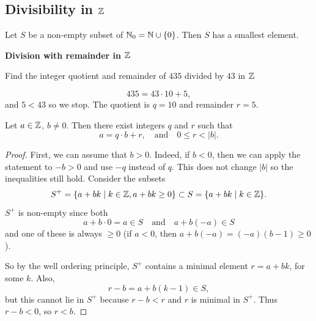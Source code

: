 \documentclass[10pt, a4paper]{article}
\begin{document}
\subsection{Divisibility in \texorpdfstring{$\mathbb{Z}$}{}}

\begin{lemma}
    Let $S$ be a non-empty subset of $\mathbb{N}_0 = \mathbb{N} \cup \{0\}$.
    Then $S$ has a smallest element.
\end{lemma}

\textbf{Division with remainder in $\mathbb{Z}$}

\begin{example}
    Find the integer quotient and remainder of $435$ divided by $43$ in $\mathbb{Z}$

    \begin{solution}
        \[
        435 = 43 \cdot 10 + 5,
        \]
        and $5 < 43$ so we stop.
        The quotient is $q = 10$ and remainder $r = 5$.
    \end{solution}
\end{example}

\begin{proposition}
    Let $a \in \mathbb{Z}$,
    $b \neq 0$.
    Then there exist integers $q$ and $r$ such that
    \[
    a = q \cdot b + r,\quad\text{and}\quad 0 \leq r < |b|.
    \]

    \begin{proof}
        First,
        we can assume that $b > 0$.
        Indeed,
        if $b < 0$,
        then we can apply the statement to $-b > 0$ and use $-q$ instead of $q$.
        This does not change $|b|$ so the inequalities still hold.
        Consider the subsets
        \[
        S ^ {+} = \{a + bk\mid k \in \mathbb{Z}, a + bk \geq 0\} \subset S = \{a + bk \mid k \in \mathbb{Z}\}.
        \]
        $S ^ {+}$ is non-empty since both
        \[
        a + b \cdot 0 = a \in S\quad\text{and}\quad a + b(-a) \in S
        \]
        and one of these is always $\geq 0$
        (if $a < 0$,
        then $a + b(-a) = (-a)(b - 1) \geq 0$).

        So by the well ordering principle,
        $S ^ {+}$ contains a minimal element $r = a + bk$,
        for some $k$.
        Also,
        \[
        r - b = a + b(k - 1) \in S,
        \]
        but this cannot lie in $S ^ {+}$ because $r - b < r$ and $r$ is minimal in $S ^ {+}$.
        Thus $r - b < 0$,
        so $r < b$.
    \end{proof}
\end{proposition}
\end{document}
